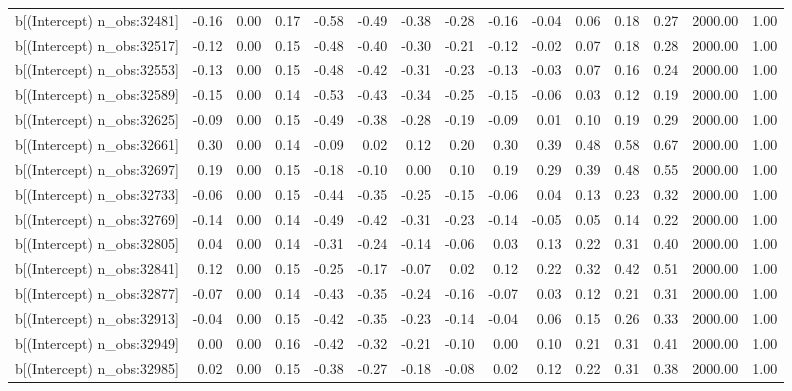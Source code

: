 \begin{table}[ht]
\begin{tabular}{rrrrrrrrrrrrrrr}
  b[(Intercept) n\_obs:32481] & -0.16 & 0.00 & 0.17 & -0.58 & -0.49 & -0.38 & -0.28 & -0.16 & -0.04 & 0.06 & 0.18 & 0.27 & 2000.00 & 1.00 \\ 
  b[(Intercept) n\_obs:32517] & -0.12 & 0.00 & 0.15 & -0.48 & -0.40 & -0.30 & -0.21 & -0.12 & -0.02 & 0.07 & 0.18 & 0.28 & 2000.00 & 1.00 \\ 
  b[(Intercept) n\_obs:32553] & -0.13 & 0.00 & 0.15 & -0.48 & -0.42 & -0.31 & -0.23 & -0.13 & -0.03 & 0.07 & 0.16 & 0.24 & 2000.00 & 1.00 \\ 
  b[(Intercept) n\_obs:32589] & -0.15 & 0.00 & 0.14 & -0.53 & -0.43 & -0.34 & -0.25 & -0.15 & -0.06 & 0.03 & 0.12 & 0.19 & 2000.00 & 1.00 \\ 
  b[(Intercept) n\_obs:32625] & -0.09 & 0.00 & 0.15 & -0.49 & -0.38 & -0.28 & -0.19 & -0.09 & 0.01 & 0.10 & 0.19 & 0.29 & 2000.00 & 1.00 \\ 
  b[(Intercept) n\_obs:32661] & 0.30 & 0.00 & 0.14 & -0.09 & 0.02 & 0.12 & 0.20 & 0.30 & 0.39 & 0.48 & 0.58 & 0.67 & 2000.00 & 1.00 \\ 
  b[(Intercept) n\_obs:32697] & 0.19 & 0.00 & 0.15 & -0.18 & -0.10 & 0.00 & 0.10 & 0.19 & 0.29 & 0.39 & 0.48 & 0.55 & 2000.00 & 1.00 \\ 
  b[(Intercept) n\_obs:32733] & -0.06 & 0.00 & 0.15 & -0.44 & -0.35 & -0.25 & -0.15 & -0.06 & 0.04 & 0.13 & 0.23 & 0.32 & 2000.00 & 1.00 \\ 
  b[(Intercept) n\_obs:32769] & -0.14 & 0.00 & 0.14 & -0.49 & -0.42 & -0.31 & -0.23 & -0.14 & -0.05 & 0.05 & 0.14 & 0.22 & 2000.00 & 1.00 \\ 
  b[(Intercept) n\_obs:32805] & 0.04 & 0.00 & 0.14 & -0.31 & -0.24 & -0.14 & -0.06 & 0.03 & 0.13 & 0.22 & 0.31 & 0.40 & 2000.00 & 1.00 \\ 
  b[(Intercept) n\_obs:32841] & 0.12 & 0.00 & 0.15 & -0.25 & -0.17 & -0.07 & 0.02 & 0.12 & 0.22 & 0.32 & 0.42 & 0.51 & 2000.00 & 1.00 \\ 
  b[(Intercept) n\_obs:32877] & -0.07 & 0.00 & 0.14 & -0.43 & -0.35 & -0.24 & -0.16 & -0.07 & 0.03 & 0.12 & 0.21 & 0.31 & 2000.00 & 1.00 \\ 
  b[(Intercept) n\_obs:32913] & -0.04 & 0.00 & 0.15 & -0.42 & -0.35 & -0.23 & -0.14 & -0.04 & 0.06 & 0.15 & 0.26 & 0.33 & 2000.00 & 1.00 \\ 
  b[(Intercept) n\_obs:32949] & 0.00 & 0.00 & 0.16 & -0.42 & -0.32 & -0.21 & -0.10 & 0.00 & 0.10 & 0.21 & 0.31 & 0.41 & 2000.00 & 1.00 \\ 
  b[(Intercept) n\_obs:32985] & 0.02 & 0.00 & 0.15 & -0.38 & -0.27 & -0.18 & -0.08 & 0.02 & 0.12 & 0.22 & 0.31 & 0.38 & 2000.00 & 1.00 \\ 

\end{tabular}
\end{table}
